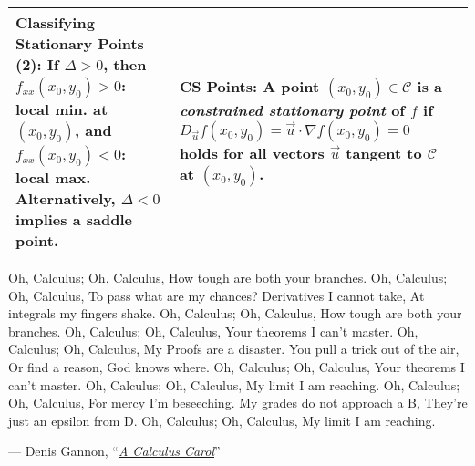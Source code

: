 \begin{tabular}{|m{.31\linewidth}|m{.31\linewidth}|m{.31\linewidth}|}
\textbf{Classifying Stationary Points (2)}:
    If
        $ \Delta > 0 $,
    then
        $ f_{xx}(x_0, y_0) > 0 $: local min. at $ (x_0, y_0) $, and
        $ f_{xx}(x_0, y_0) < 0 $: local max.
    Alternatively, $ \Delta < 0 $ implies a saddle point. &

\textbf{CS Points}:
    A point $ (x_0, y_0) \in \mathcal{C} $ is a \emph{constrained stationary
    point} of $ f $ if
        $ D_{\vec{u}}f(x_0, y_0) =
            \vec{u} \cdot \nabla f(x_0, y_0) =
            0 $
        holds for all vectors $ \vec{u} $ tangent to $ \mathcal{C} $ at
            $ (x_0, y_0) $. \\

\hline
\end{tabular}

\vfill
\begin{center}
    Oh, Calculus; Oh, Calculus,
    How tough are both your branches.
    Oh, Calculus; Oh, Calculus,
    To pass what are my chances?
    Derivatives I cannot take,
    At integrals my fingers shake.
    Oh, Calculus; Oh, Calculus,
    How tough are both your branches.
    Oh, Calculus; Oh, Calculus,
    Your theorems I can't master.
    Oh, Calculus; Oh, Calculus,
    My Proofs are a disaster.
    You pull a trick out of the air,
    Or find a reason, God knows where.
    Oh, Calculus; Oh, Calculus,
    Your theorems I can't master.
    Oh, Calculus; Oh, Calculus,
    My limit I am reaching.
    Oh, Calculus; Oh, Calculus,
    For mercy I'm beseeching.
    My grades do not approach a B,
    They're just an epsilon from D.
    Oh, Calculus; Oh, Calculus,
    My limit I am reaching.
\end{center}
\begin{flushright}
    --- Denis Gannon,
        ``\href{https://web.math.utk.edu/~vasili/va/files/oh\_calculus.html}%
        {\textit{A Calculus Carol}}''
\end{flushright}
\vspace{-1em}


